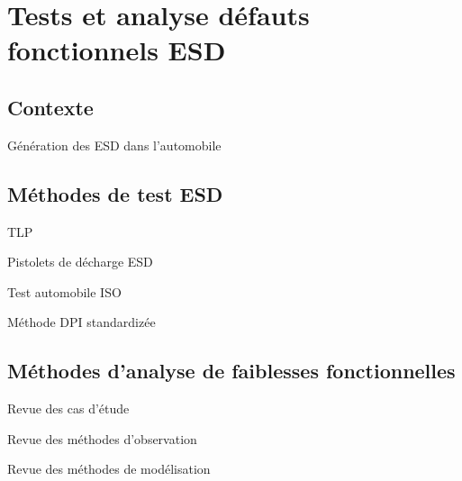 \chapter{Tests et analyse défauts fonctionnels ESD}
\section{Contexte}

Génération des ESD dans l'automobile


\section{Méthodes de test ESD}

TLP

Pistolets de décharge ESD

Test automobile ISO

Méthode DPI standardizée

\section{Méthodes d'analyse de faiblesses fonctionnelles}

Revue des cas d'étude

Revue des méthodes d'observation

Revue des méthodes de modélisation

